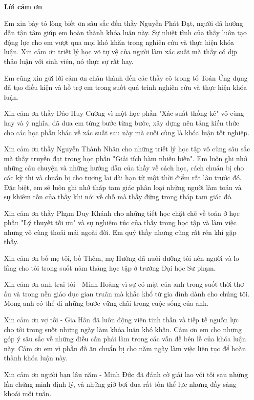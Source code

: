 \begin{center}
\LARGE{\textbf{Lời cảm ơn}}
\end{center}
Em xin bày tỏ lòng biết ơn sâu sắc đến thầy Nguyễn Phát Đạt, người đã hướng dẫn tận tâm giúp em hoàn thành khóa luận này. Sự nhiệt tình của thầy luôn tạo động lực cho em vượt qua mọi khó khăn trong nghiên cứu và thực hiện khóa luận. Xin cảm ơn triết lý học võ tự vệ của người làm xác suất mà thầy có dịp thảo luận với sinh viên, nó thực sự rất hay.

Em cũng xin gửi lời cảm ơn chân thành đến các thầy cô trong tổ Toán Ứng dụng đã tạo điều kiện và hỗ trợ em trong suốt quá trình nghiên cứu và thực hiện khóa luận.

Xin cảm ơn thầy Đào Huy Cường vì một học phần "Xác suất thống kê" vô cùng hay và ý nghĩa, đã đưa em từng bước từng bước, xây dựng nên tảng kiến thức cho các học phần khác về xác suất sau này mà cuối cùng là khóa luận tốt nghiệp.

Xin cảm ơn thầy Nguyễn Thành Nhân cho những triết lý học tập vô cùng sâu sắc mà thầy truyền đạt trong học phần "Giải tích hàm nhiều biến". Em luôn ghi nhớ những câu chuyện và những hướng dẫn của thầy về cách học, cách chuẩn bị cho các kỳ thi và chuẩn bị cho tương lai dài hạn từ một thời điểm rất lâu trước đó. Đặc biệt, em sẽ luôn ghi nhớ tháp tam giác phân loại những người làm toán và sự khiêm tốn của thầy khi nói về chỗ mà thầy đứng trong tháp tam giác đó. 

Xin cảm ơn thầy Phạm Duy Khánh cho những tiết học chặt chẽ về toán ở học phần "Lý thuyết tối ưu" và sự nghiêm túc của thầy trong học tập và làm việc nhưng vô cùng thoải mái ngoài đời. Em quý thầy nhưng cũng rất rén khi gặp thầy.

Xin cảm ơn bố mẹ tôi, bố Thêm, mẹ Hường đã nuôi dưỡng tôi nên người và lo lắng cho tôi trong suốt năm tháng học tập ở trường Đại học Sư phạm. 

Xin cảm ơn anh trai tôi - Minh Hoàng vì sự có mặt của anh trong suốt thời thơ ấu và trong nền giáo dục gian truân mà khắc khổ từ gia đình dành cho chúng tôi. Mong anh có thể đi những bước vững chãi trong cuộc sống của anh.

Xin cảm ơn vợ tôi - Gia Hân đã luôn động viên tinh thần và tiếp tế nguồn lực cho tôi trong suốt những ngày làm khóa luận khó khăn. Cảm ơn em cho những góp ý sâu sắc về những điều cần phải làm trong các vấn đề bên lề của khóa luận này. Cảm ơn em vì phần đồ ăn chuẩn bị cho năm ngày làm việc liên tục để hoàn thành khóa luận này.

Xin cảm ơn người bạn lâu năm - Minh Đức đã đánh cờ giải lao với tôi sau những lần chứng minh định lý, và những giờ bơi đua rất tốn thể lực nhưng đầy sảng khoái mỗi tuần.

